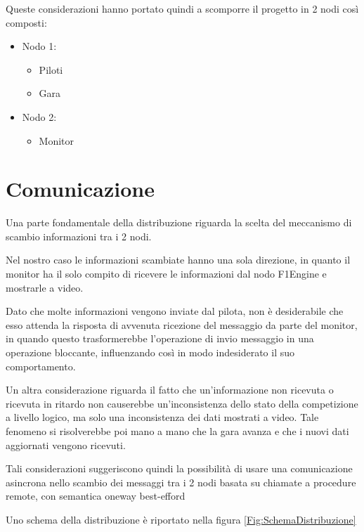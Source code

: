 \documentclass[a4paper,11pt, twoside]{book}
\begin{document}
      Queste considerazioni hanno portato quindi a scomporre il progetto in 2 nodi così composti:
      
      \begin{itemize}
	\item Nodo 1:
	\begin{itemize}
	  \item Piloti
	  \item Gara
	\end{itemize}
	\item Nodo 2:
	\begin{itemize}
	  \item Monitor
	\end{itemize}
      \end{itemize}
          
    \section{Comunicazione}
    \label{Comunicazione}
      Una parte fondamentale della distribuzione riguarda la scelta del meccanismo di scambio informazioni tra i 2 nodi.
      
      Nel nostro caso le informazioni scambiate hanno una sola direzione, in quanto il monitor ha il solo compito di
      ricevere le informazioni dal nodo F1Engine e mostrarle a video.
      
      Dato che molte informazioni vengono inviate dal pilota, non è desiderabile che esso
      attenda la risposta di avvenuta ricezione del messaggio da parte del monitor,
      in quando questo trasformerebbe l'operazione di invio messaggio in una operazione bloccante, influenzando così
      in modo indesiderato il suo comportamento.
      
      Un altra considerazione riguarda il fatto che un'informazione non ricevuta o ricevuta in ritardo 
      non causerebbe un'inconsistenza dello stato della competizione a livello logico,
      ma solo una inconsistenza dei dati mostrati a video. Tale fenomeno si risolverebbe poi mano a mano che la gara avanza
      e che i nuovi dati aggiornati vengono ricevuti.
      
      Tali considerazioni suggeriscono quindi la possibilità di usare una comunicazione asincrona nello scambio dei messaggi
      tra i 2 nodi basata su chiamate a procedure remote, con semantica oneway best-efford
            
      Uno schema della distribuzione è riportato nella figura \ref{Fig:SchemaDistribuzione}
      
\end{document}
